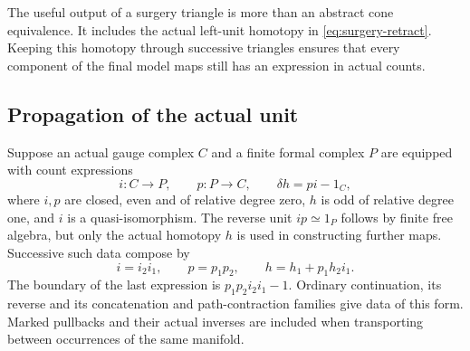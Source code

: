 \documentclass[11pt]{amsart}
\theoremstyle{definition}
\theoremstyle{remark}
\theoremstyle{plain}
\begin{document}
The useful output of a surgery triangle is more than an abstract
cone equivalence. It includes the actual left-unit homotopy in
\eqref{eq:surgery-retract}. Keeping this homotopy through successive
triangles ensures that every component of the final model maps
still has an expression in actual counts.

\subsection{Propagation of the actual unit}
Suppose an actual gauge complex $C$ and a finite formal complex
$P$ are equipped with count expressions
\begin{equation}\label{eq:model-package}
 i:C\longrightarrow P,\qquad p:P\longrightarrow C,\qquad
 \delta h=pi-1_C,
\end{equation}
where $i,p$ are closed, even and of relative degree zero, $h$
is odd of relative degree one, and $i$ is a quasi-isomorphism.
The reverse unit $ip\simeq1_P$ follows by finite free algebra,
but only the actual homotopy $h$ is used in constructing further
maps. Successive such data compose by
\begin{equation}\label{eq:package-compose}
 i=i_2i_1,\qquad p=p_1p_2,\qquad h=h_1+p_1h_2i_1.
\end{equation}
The boundary of the last expression is $p_1p_2i_2i_1-1$.
Ordinary continuation, its reverse and its concatenation and
path-contraction families give data of this form. Marked pullbacks
and their actual inverses are included when transporting between
occurrences of the same manifold.
\end{document}
